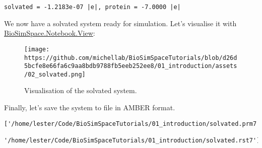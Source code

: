 \begin{verbatim}
solvated = -1.2183e-07 |e|, protein = -7.0000 |e|
\end{verbatim}

We now have a solvated system ready for simulation. Let's visualise it
with
\href{https://biosimspace.org/api/generated/BioSimSpace.Notebook.View.html\#BioSimSpace.Notebook.View}{BioSimSpace.Notebook.View}:

\begin{Shaded}
\begin{Highlighting}[]
\OperatorTok{=}
\end{Highlighting}
\end{Shaded}

\begin{figure}
\centering
\texttt{[image: https://github.com/michellab/BioSimSpaceTutorials/blob/d26d5bcfe8e66fa6c9aa8bdb9788fb5eeb252ee8/01\_introduction/assets/02\_solvated.png]}
\caption{Visualisation of the solvated system.}
\end{figure}

Finally, let's save the system to file in AMBER format.

\begin{Shaded}
\begin{Highlighting}[]
\NormalTok{, solvated, [}\NormalTok{, }\NormalTok{])}
\end{Highlighting}
\end{Shaded}

\begin{verbatim}
['/home/lester/Code/BioSimSpaceTutorials/01_introduction/solvated.prm7',
 '/home/lester/Code/BioSimSpaceTutorials/01_introduction/solvated.rst7']
\end{verbatim}
